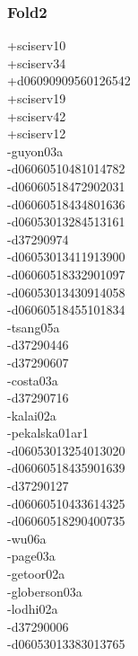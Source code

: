 \begin{multicols}{4}
\subsubsection*{Fold2}
+sciserv10\\
+sciserv34\\
+d06090909560126542\\
+sciserv19\\
+sciserv42\\
+sciserv12\\
-guyon03a\\
-d06060510481014782\\
-d06060518472902031\\
-d06060518434801636\\
-d06053013284513161\\
-d37290974\\
-d06053013411913900\\
-d06060518332901097\\
-d06053013430914058\\
-d06060518455101834\\
-tsang05a\\
-d37290446\\
-d37290607\\
-costa03a\\
-d37290716\\
-kalai02a\\
-pekalska01ar1\\
-d06053013254013020\\
-d06060518435901639\\
-d37290127\\
-d06060510433614325\\
-d06060518290400735\\
-wu06a\\
-page03a\\
-getoor02a\\
-globerson03a\\
-lodhi02a\\
-d37290006\\
-d06053013383013765\\

\end{multicols}
